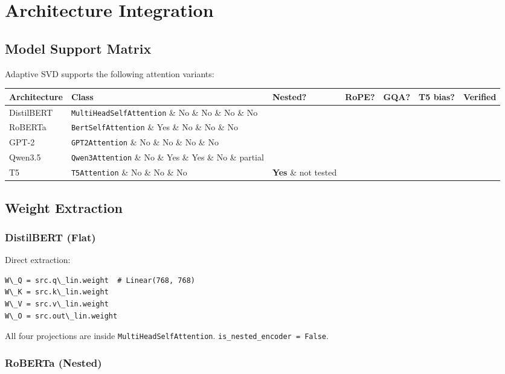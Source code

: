 
\section{Architecture Integration}

\subsection{Model Support Matrix}

Adaptive SVD supports the following attention variants:

\begin{table}[H]
\centering
\small
\begin{tabular}{lllllll}
\toprule
\textbf{Architecture} & \textbf{Class} & \textbf{Nested?} & \textbf{RoPE?} & \textbf{GQA?} & \textbf{T5 bias?} & \textbf{Verified} \\
\midrule
DistilBERT & \texttt{MultiHeadSelfAttention} \& No \& No \& No \& No &  \\
RoBERTa & \texttt{BertSelfAttention} \& Yes \& No \& No \& No &  \\
GPT-2 & \texttt{GPT2Attention} \& No \& No \& No \& No &  \\
Qwen3.5 & \texttt{Qwen3Attention} \& No \& Yes \& Yes \& No \& partial \\
T5 & \texttt{T5Attention} \& No \& No \& No & \textbf{Yes} \& not tested \\
\bottomrule
\end{tabular}
\end{table}

\subsection{Weight Extraction}

\subsubsection{DistilBERT (Flat)}

Direct extraction:

\begin{lstlisting}
W\_Q = src.q\_lin.weight  # Linear(768, 768)
W\_K = src.k\_lin.weight
W\_V = src.v\_lin.weight
W\_O = src.out\_lin.weight
\end{lstlisting}

All four projections are inside \texttt{MultiHeadSelfAttention}. \texttt{is\_nested\_encoder = False}.

\subsubsection{RoBERTa (Nested)}

